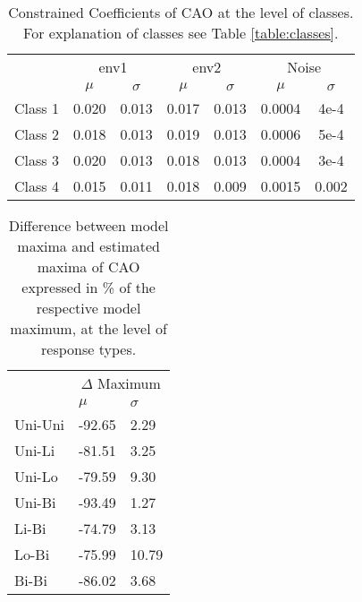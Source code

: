			\vspace{10em}
		
			\begin{table*}[h!]
				 	
				\normalsize
				\caption{Constrained Coefficients of CAO at the level of classes. For explanation of classes see Table \ref{table:classes}.}
				\centering
			
				\begin{tabular}{@{}lcccccc@{}}
					\toprule
					& \multicolumn{2}{c}{env1} & \multicolumn{2}{c}{env2} & \multicolumn{2}{c}{Noise}\\\cmidrule(l){2-3} \cmidrule(l){4-5} \cmidrule(l){6-7}
					& $\mu$ & $\sigma$ & $\mu$ & $\sigma$ & $\mu$ & $\sigma$\\
					\hline
					Class 1 & 0.020 & 0.013 & 0.017 & 0.013 & 0.0004 & 4e-4 \\
					Class 2 & 0.018 & 0.013 & 0.019 & 0.013 & 0.0006 & 5e-4 \\
					Class 3 & 0.020 & 0.013 & 0.018 & 0.013 & 0.0004 & 3e-4 \\
					Class 4 & 0.015 & 0.011 & 0.018 & 0.009 & 0.0015 & 0.002 \\
					\toprule
				\end{tabular}
			
				\label{tab:caosm2}
			
			\end{table*}
		
			\vspace{10em}
		
			\begin{table*}[h!]  
			
				\normalsize
				\caption{Difference between model maxima and estimated maxima of CAO expressed in \% of the respective model maximum, at the level of response types.}
				\centering
				
				\begin{tabular}{@{}lll@{}}
					\toprule
					& \multicolumn{2}{c}{$\Delta$ Maximum} \\ \cmidrule{2-3}
					& $\mu$   & $\sigma$   \\
					\hline
					Uni-Uni & -92.65 & 2.29  \\
					Uni-Li  & -81.51 & 3.25  \\
					Uni-Lo  & -79.59 & 9.30  \\
					Uni-Bi  & -93.49 & 1.27  \\
					Li-Bi   & -74.79 & 3.13  \\
					Lo-Bi   & -75.99 & 10.79 \\
					Bi-Bi   & -86.02 & 3.68  \\
					\toprule 
				\end{tabular}
				
				\label{tab:caosm3}
			
			\end{table*}
		
